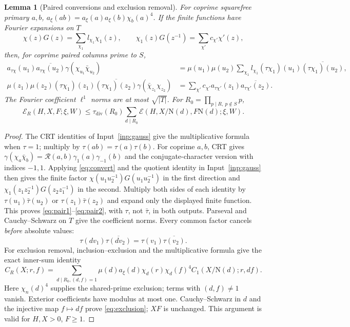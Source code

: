 \documentclass[11pt,a4paper]{article}
\numberwithin{equation}{section}
\newtheorem{lemma}[theorem]{Lemma}
\theoremstyle{definition}
\theoremstyle{remark}
\newcommand{\N}{\mathrm N}
\newcommand{\E}{\mathcal E}
\newcommand{\tauD}{\tau_{\mathrm{div}}}
\begin{document}
\begin{lemma}[Paired conversions and exclusion removal]\label{lem:paired}
For coprime squarefree primary $a,b$, $a_\xi(ab)=a_\xi(a)a_\xi(b)\chi_b(a)^4$. If the finite functions have Fourier expansions on $T$
\[
 \chi(z)G(z)=\sum_{\chi_1}l_{\chi_1}\chi_1(z),\qquad
 \chi_1(z)G(z^{-1})=\sum_{\chi'}c_{\chi'}\chi'(z),
\]
then, for coprime paired columns prime to $S$,
\begin{align}\label{eq:pair1}
 a_{\tau\chi}(u_1)\overline{a_{\tau\chi}(u_2)}\gamma(\chi_{u_1}\bar\chi_{u_2})
 &=\mu(u_1)\mu(u_2)\sum_{\chi_1}l_{\chi_1}(\tau\chi_1)(u_1)\overline{(\tau\chi_1)(u_2)},\\
 \mu(z_1)\mu(z_2)(\tau\chi_1)(z_1)\overline{(\tau\chi_1)(z_2)}\gamma(\bar\chi_{z_1}\chi_{z_2})
 &=\sum_{\chi'}c_{\chi'}a_{\tau\chi'}(z_1)\overline{a_{\tau\chi'}(z_2)}.\label{eq:pair2}
\end{align}
The Fourier coefficient $\ell^1$ norms are at most $\sqrt{|T|}$. For $R_0=\prod_{p\mid R,\ p\notin S}p$,
\begin{equation}\label{eq:exclusion}
 \E_R(H,X,F;\xi,W)\le\tauD(R_0)\sum_{d\mid R_0}
 \E(H,X/\N(d),F\N(d);\xi,W).
\end{equation}
\end{lemma}
\begin{proof}
The CRT identities of Input~\ref{inp:gauss} give the multiplicative formula when $\tau=1$; multiply by $\tau(ab)=\tau(a)\tau(b)$. For coprime $a,b$, CRT gives $\gamma(\chi_a\bar\chi_b)=\mathcal R(a,b)\gamma_1(a)\gamma_{-1}(b)$ and the conjugate-character version with indices $-1,1$. Applying \eqref{eq:convert} and the quotient identity in Input~\ref{inp:gauss} then gives the finite factor $\chi(u_1u_2^{-1})G(u_1u_2^{-1})$ in the first direction and $\chi_1(z_1z_2^{-1})G(z_2z_1^{-1})$ in the second. Multiply both sides of each identity by $\tau(u_1)\bar\tau(u_2)$ or $\tau(z_1)\bar\tau(z_2)$ and expand only the displayed finite function. This proves \eqref{eq:pair1}--\eqref{eq:pair2}, with $\tau$, not $\bar\tau$, in both outputs. Parseval and Cauchy--Schwarz on $T$ give the coefficient norms. Every common factor cancels \emph{before} absolute values:
\begin{equation}\label{eq:commonphase}
 \tau(dv_1)\overline{\tau(dv_2)}=\tau(v_1)\overline{\tau(v_2)}.
\end{equation}
For exclusion removal, inclusion--exclusion and the multiplicative formula give the exact inner-sum identity
\[
 C_R(X;r,f)=\sum_{d\mid R_0,(d,f)=1}\mu(d)a_\xi(d)\chi_d(r)\chi_d(f)^4C_1(X/\N(d);r,df).
\]
Here $\chi_n(d)^4$ supplies the shared-prime exclusion; terms with $(d,f)\ne1$ vanish. Exterior coefficients have modulus at most one. Cauchy--Schwarz in $d$ and the injective map $f\mapsto df$ prove \eqref{eq:exclusion}; $XF$ is unchanged. This argument is valid for $H,X>0$, $F\ge1$.
\end{proof}
\end{document}
